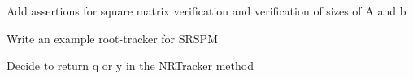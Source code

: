 
\begin{DoxyRefList}
\item[Member \mbox{\hyperlink{utils_8h_ad2246d831bd56822936b616e92e12b76}{Linear\+Solve}} (Matrix\+Xd Amat, Vector\+Xd bvec)]\label{todo__todo000003}%
%
Add assertions for square matrix verification and verification of sizes of A and b  
\item[Member \mbox{\hyperlink{main_8cpp_abf9e6b7e6f15df4b525a2e7705ba3089}{main}} (int argc, char const $\ast$argv\mbox{[}\mbox{]})]\label{todo__todo000001}%
%
Write an example root-\/tracker for S\+R\+S\+PM  
\item[Member \mbox{\hyperlink{classRootTracker_a6bb3dcb73ea58ac44ab15d7803de3d5a}{Root\+Tracker::N\+R\+Tracker}} (Vector\+Xd x, Vector\+Xd y, std\+::function$<$ Vector\+Xd(\+Vector\+Xd)$>$ f, std\+::function$<$ Matrix\+Xd(\+Vector\+Xd)$>$ Jfy, double eps=pow(10, -\/10))]\label{todo__todo000002}%
%
Decide to return q or y in the N\+R\+Tracker method 
\end{DoxyRefList}